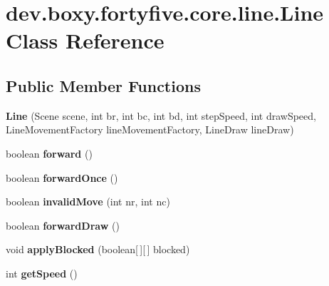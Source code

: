 \hypertarget{classdev_1_1boxy_1_1fortyfive_1_1core_1_1line_1_1_line}{
\section{dev.boxy.fortyfive.core.line.Line Class Reference}
\label{d1/de6/classdev_1_1boxy_1_1fortyfive_1_1core_1_1line_1_1_line}
}
\subsection*{Public Member Functions}
\begin{DoxyCompactItemize}
\item 
\hypertarget{classdev_1_1boxy_1_1fortyfive_1_1core_1_1line_1_1_line_ae545b18a8113d1eb719e06a2d6d4151a}{
{\bfseries Line} (Scene scene, int br, int bc, int bd, int stepSpeed, int drawSpeed, LineMovementFactory lineMovementFactory, LineDraw lineDraw)}
\label{d1/de6/classdev_1_1boxy_1_1fortyfive_1_1core_1_1line_1_1_line_ae545b18a8113d1eb719e06a2d6d4151a}

\item 
\hypertarget{classdev_1_1boxy_1_1fortyfive_1_1core_1_1line_1_1_line_a6e546482a2e639e4ef539bfa739357c0}{
boolean {\bfseries forward} ()}
\label{d1/de6/classdev_1_1boxy_1_1fortyfive_1_1core_1_1line_1_1_line_a6e546482a2e639e4ef539bfa739357c0}

\item 
\hypertarget{classdev_1_1boxy_1_1fortyfive_1_1core_1_1line_1_1_line_a3e095c3930d4187647738699263737ae}{
boolean {\bfseries forwardOnce} ()}
\label{d1/de6/classdev_1_1boxy_1_1fortyfive_1_1core_1_1line_1_1_line_a3e095c3930d4187647738699263737ae}

\item 
\hypertarget{classdev_1_1boxy_1_1fortyfive_1_1core_1_1line_1_1_line_af8c2c72d8c6e56ad1a8360a5c4b519e1}{
boolean {\bfseries invalidMove} (int nr, int nc)}
\label{d1/de6/classdev_1_1boxy_1_1fortyfive_1_1core_1_1line_1_1_line_af8c2c72d8c6e56ad1a8360a5c4b519e1}

\item 
\hypertarget{classdev_1_1boxy_1_1fortyfive_1_1core_1_1line_1_1_line_a4d696de55395fee8e0c977d48c4f0785}{
boolean {\bfseries forwardDraw} ()}
\label{d1/de6/classdev_1_1boxy_1_1fortyfive_1_1core_1_1line_1_1_line_a4d696de55395fee8e0c977d48c4f0785}

\item 
\hypertarget{classdev_1_1boxy_1_1fortyfive_1_1core_1_1line_1_1_line_a7ee6274f2b671b2fd1e54c35bb2a7ee1}{
void {\bfseries applyBlocked} (boolean\mbox{[}$\,$\mbox{]}\mbox{[}$\,$\mbox{]} blocked)}
\label{d1/de6/classdev_1_1boxy_1_1fortyfive_1_1core_1_1line_1_1_line_a7ee6274f2b671b2fd1e54c35bb2a7ee1}

\item 
\hypertarget{classdev_1_1boxy_1_1fortyfive_1_1core_1_1line_1_1_line_a6dc6766328dee2d63205ed4e35a28b52}{
int {\bfseries getSpeed} ()}
\label{d1/de6/classdev_1_1boxy_1_1fortyfive_1_1core_1_1line_1_1_line_a6dc6766328dee2d63205ed4e35a28b52}

\end{DoxyCompactItemize}
